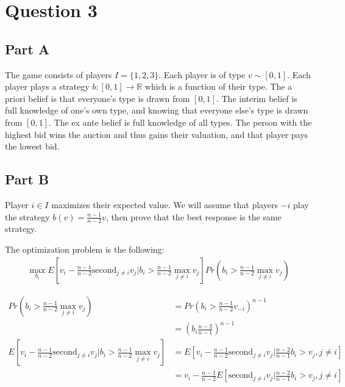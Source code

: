\documentclass[11pt]{article} %
\begin{document}
\section{Question 3}
\subsection{Part A}
The game consists of players $I = \{ 1,2,3\}$. Each player is of type $v \sim  [0,1]$. Each player plays a strategy $b:[0,1]\rightarrow \mathbb{R}$ which is a function of their type. The a priori belief is that everyone's type is drawn from $[0,1]$. The interim belief is full knowledge of one's own type, and knowing that everyone else's type is drawn from $[0,1]$. The ex ante belief is full knowledge of all types. The person with the highest bid wins the auction and thus gains their valuation, and that player pays the lowest bid.
\subsection{Part B}
Player $i\in I$ maximizes their expected value. We will assume that  players $-i$ play the strategy $b(v) = \frac{n-1}{n-2}v $, then prove that the best response is the same strategy.

The optimization problem is the following:
\begin{align*}
\max_{b_i}E[v_i - \frac{n-1}{n-2}\text{second}_{j \neq i}v_j|b_i>\frac{n-1}{n-2}\max_{j\neq i} v_j]Pr(b_i>\frac{n-1}{n-2}\max_{j\neq i} v_j) 
\end{align*}

\begin{align*}
Pr(b_i>\frac{n-1}{n-2}\max_{j\neq i} v_j) &= Pr\left(b_i>\frac{n-1}{n-2}v_{-i}\right)^{n-1}\\
&= \left(b_i\frac{n-2}{n-1}\right)^{n-1}\\
E[v_i - \frac{n-1}{n-2}\text{second}_{j \neq i}v_j|b_i>\frac{n-1}{n-2}\max_{j\neq i} v_j]  &= E[v_i - \frac{n-1}{n-2}\text{second}_{j \neq i}v_j|\frac{n-2}{n-1}b_i>v_{j}, j\neq i ] \\
&= v_i - \frac{n-1}{n-2}E[\text{second}_{j \neq i}v_j|\frac{n-2}{n-1}b_i>v_{j}, j\neq i ]
\end{align*}
\end{document}
